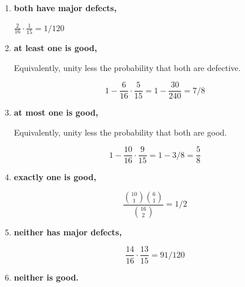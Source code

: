 \documentclass[10pt, oneside]{article}
\begin{document}
\begin{enumerate}[label=2.\arabic*]
\begin{enumerate}
  Choose one of ten good articles out of sixteen total articles in the first round, followed by one of nine good articles out of the remaining fifteen articles in the second, invoke dependence of probabilities, $\frac{10}{16} \cdot \frac{9}{15} = \boxed{3/8}$.
  
  All sub-parts below proceed using similar logic of the product of probabilities.
  	
  	\item \begin{tcolorbox}[
  colback=Cerulean!5!white,
  colframe=Cerulean!75!black]
  \textbf{both have major defects,}
  \end{tcolorbox}
  
  	$\frac{2}{16} \cdot \frac{1}{15} = \boxed{1/120}$
  	\item \begin{tcolorbox}[
  colback=Cerulean!5!white,
  colframe=Cerulean!75!black]
  \textbf{at least one is good,}
  \end{tcolorbox}
  
  	Equivalently, unity less the probability that both are defective.
	
	\[ 1 - \frac{6}{16} \cdot \frac{5}{15} = 1 - \frac{30}{240} = \boxed{7/8} \]
  	\item \begin{tcolorbox}[
  colback=Cerulean!5!white,
  colframe=Cerulean!75!black]
  \textbf{at most one is good,}
  \end{tcolorbox}
  
  	Equivalently, unity less the probability that both are good. 
	
	\[ 1 - \frac{10}{16} \cdot \frac{9}{15} = 1 - 3/8 = \boxed{ \frac{5}{8} } \]
  	\item \begin{tcolorbox}[
  colback=Cerulean!5!white,
  colframe=Cerulean!75!black]
  \textbf{exactly one is good,}
  \end{tcolorbox}
  
  \[ \frac{\binom{10}{1} \binom{6}{1} }{\binom{16}{2}} = \boxed{1/2} \]
  	\item \begin{tcolorbox}[
  colback=Cerulean!5!white,
  colframe=Cerulean!75!black]
  \textbf{neither has major defects,}
  \end{tcolorbox}
  
  \[ \frac{14}{16} \cdot \frac{13}{15} = \boxed{91/120} \]
  	\item \begin{tcolorbox}[
  colback=Cerulean!5!white,
  colframe=Cerulean!75!black]
  \textbf{neither is good.}
  \end{tcolorbox}
  

\end{enumerate}
\end{enumerate}
\end{document}
